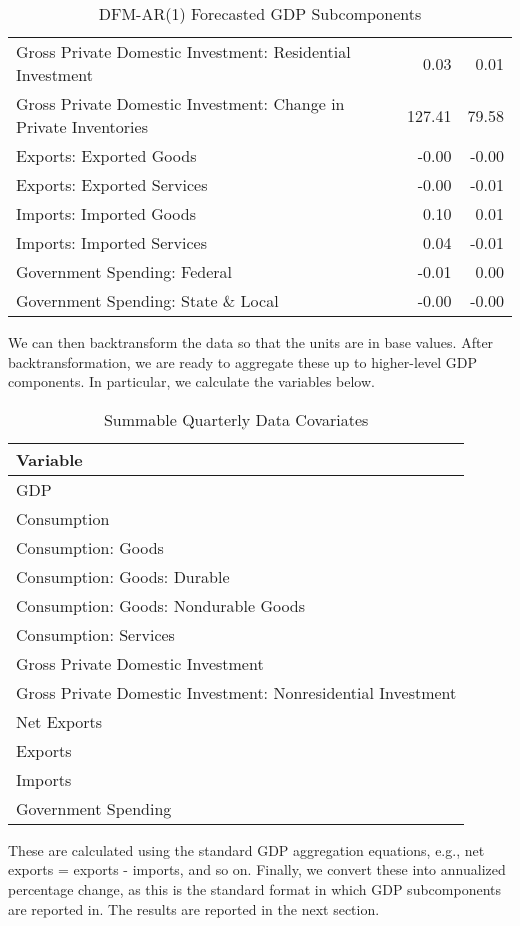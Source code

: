 \documentclass[11pt, letterpaper]{article}\usepackage[]{graphicx}\usepackage[]{color}
\begin{document}
\begin{table}[H]
\begin{tabular}{lrrr}
  Gross Private Domestic Investment: Residential Investment &  & 0.03 & 0.01 \\ 
  Gross Private Domestic Investment: Change in Private Inventories &  & 127.41 & 79.58 \\ 
  Exports: Exported Goods &  & -0.00 & -0.00 \\ 
  Exports: Exported Services &  & -0.00 & -0.01 \\ 
  Imports: Imported Goods &  & 0.10 & 0.01 \\ 
  Imports: Imported Services &  & 0.04 & -0.01 \\ 
  Government Spending: Federal &  & -0.01 & 0.00 \\ 
  Government Spending: State \& Local &  & -0.00 & -0.00 \\ 
   \hline
\end{tabular}
\endgroup
\caption{DFM-AR(1) Forecasted GDP Subcomponents} 
\end{table}


We can then backtransform the data so that the units are in base values. After backtransformation, we are ready to aggregate these up to higher-level GDP components. In particular, we calculate the variables below.
\begin{table}[H]
\centering
\begingroup\scriptsize
\begin{tabular}{l}
  \hline
Variable \\ 
  \hline
GDP \\ 
  Consumption \\ 
  Consumption: Goods \\ 
  Consumption: Goods: Durable \\ 
  Consumption: Goods: Nondurable Goods \\ 
  Consumption: Services \\ 
  Gross Private Domestic Investment \\ 
  Gross Private Domestic Investment: Nonresidential Investment \\ 
  Net Exports \\ 
  Exports \\ 
  Imports \\ 
  Government Spending \\ 
   \hline
\end{tabular}
\endgroup
\caption{Summable Quarterly Data Covariates} 
\end{table}

These are calculated using the standard GDP aggregation equations, e.g., net exports = exports - imports, and so on.
Finally, we convert these into annualized percentage change, as this is the standard format in which GDP subcomponents are reported in. The results are reported in the next section.
\end{document}
